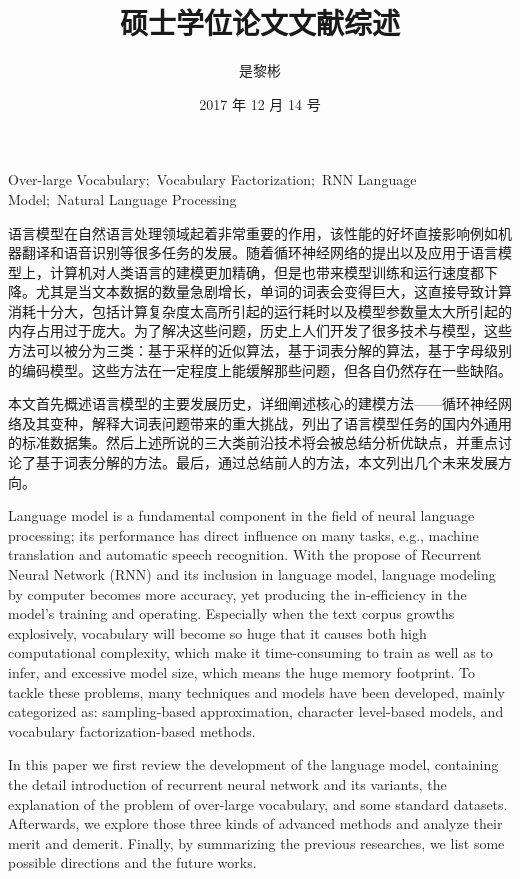 \documentclass[12pt,a4paper]{article}
\title{硕士学位论文文献综述}
\author{是黎彬}
\date{2017 年 12 月 14 号}
\begin{document}
\maketitle



{Over-large Vocabulary;\ Vocabulary Factorization;\ RNN Language Model;\ Natural Language Processing}

\begin{abstract_ch}
语言模型在自然语言处理领域起着非常重要的作用，该性能的好坏直接影响例如机器翻译和语音识别等很多任务的发展。随着循环神经网络的提出以及应用于语言模型上，计算机对人类语言的建模更加精确，但是也带来模型训练和运行速度都下降。尤其是当文本数据的数量急剧增长，单词的词表会变得巨大，这直接导致计算消耗十分大，包括计算复杂度太高所引起的运行耗时以及模型参数量太大所引起的内存占用过于庞大。为了解决这些问题，历史上人们开发了很多技术与模型，这些方法可以被分为三类：基于采样的近似算法，基于词表分解的算法，基于字母级别的编码模型。这些方法在一定程度上能缓解那些问题，但各自仍然存在一些缺陷。

本文首先概述语言模型的主要发展历史，详细阐述核心的建模方法——循环神经网络及其变种，解释大词表问题带来的重大挑战，列出了语言模型任务的国内外通用的标准数据集。然后上述所说的三大类前沿技术将会被总结分析优缺点，并重点讨论了基于词表分解的方法。最后，通过总结前人的方法，本文列出几个未来发展方向。
\end{abstract_ch}
\newpage
\begin{abstract_en}
Language model is a fundamental component in the field of neural language processing; its performance has direct influence on many tasks, e.g., machine translation and automatic speech recognition. With the propose of Recurrent Neural Network (RNN) and its inclusion in language model, language modeling by computer becomes more accuracy, yet producing the in-efficiency in the model’s training and operating. Especially when the text corpus growths explosively, vocabulary will become so huge that it causes both high computational complexity, which make it time-consuming to train as well as to infer, and excessive model size, which means the huge memory footprint. To tackle these problems, many techniques and models have been developed, mainly categorized as: sampling-based approximation, character level-based models, and vocabulary factorization-based methods.

In this paper we first review the development of the language model, containing the detail introduction of recurrent neural network and its variants, the explanation of the problem of over-large vocabulary, and some standard datasets. Afterwards, we explore those three kinds of advanced methods and analyze their merit and demerit. Finally, by summarizing the previous researches, we list some possible directions and the future works.

\end{abstract_en}
\newpage
\tableofcontents
\newpage
\end{document}
